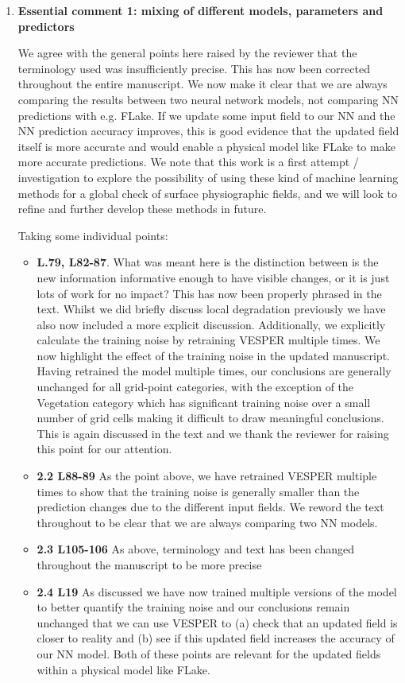 \documentclass[10pt]{article}
\begin{document}
\begin{enumerate}
	\item \textbf{Essential comment 1: mixing of different models, parameters and predictors}
	
	We agree with the general points here raised by the reviewer that the terminology used was insufficiently precise. This has now been corrected throughout the entire manuscript. We now make it clear that we are always comparing the results between two neural network models, not comparing NN predictions with e.g. FLake. If we update some input field to our NN and the NN prediction accuracy improves, this is good evidence that the updated field itself is more accurate and would enable a physical model like FLake to make more accurate predictions. We note that this work is a first attempt / investigation to explore the possibility of using these kind of machine learning methods for a global check of surface physiographic fields, and we will look to refine and further develop these methods in future.
	
	Taking some individual points:
	
	\begin{itemize}
		\item \textbf{L.79, L82-87}. What was meant here is the distinction between is the new information informative enough to have visible changes, or it is just lots of work for no impact? This has now been properly phrased in the text. Whilst we did briefly discuss local degradation previously we have also now included a more explicit discussion. Additionally, we explicitly calculate the training noise by retraining VESPER multiple times. We now highlight the effect of the training noise in the updated manuscript. Having retrained the model multiple times, our conclusions are generally unchanged for all grid-point categories, with the exception of the Vegetation category which has significant training noise over a small number of grid cells making it difficult to draw meaningful conclusions. This is again discussed in the text and we thank the reviewer for raising this point for our attention. 		
		\item \textbf{2.2 L88-89} As the point above, we have retrained VESPER multiple times to show that the training noise is generally smaller than the prediction changes due to the different input fields. We reword the text throughout to be clear that we are always comparing two NN models.
		\item \textbf{2.3 L105-106}  As above, terminology and text has been changed throughout the manuscript to be more precise
		\item \textbf{2.4 L19}  As discussed we have now trained multiple versions of the model to better quantify the training noise and our conclusions remain unchanged that we can use VESPER to (a) check that an updated field is closer to reality and (b) see if this updated field increases the accuracy of our NN model. Both of these points are relevant for the updated fields within a physical model like FLake.
	\end{itemize}
	


\end{enumerate}
\end{document}
